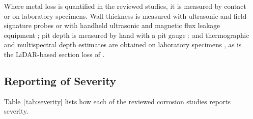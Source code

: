 Where metal loss is quantified in the reviewed studies, it is measured by contact
or on laboratory specimens. Wall thickness is measured with ultrasonic and field
signature probes \citep{Huang2026a} or with handheld ultrasonic and magnetic flux leakage
equipment \citep{Zheng2025}; pit depth is measured by hand with a pit gauge \citep{Khodabux2021a}; and
thermographic and multispectral depth estimates are obtained on laboratory
specimens \citep{Doshvarpassand2022,Liu2021,Egodawela2025}, as is the LiDAR-based section loss of \citep{Maru2025}.

\subsection{Reporting of Severity}

Table~\ref{tab:severity} lists how each of the reviewed corrosion studies
reports severity.

